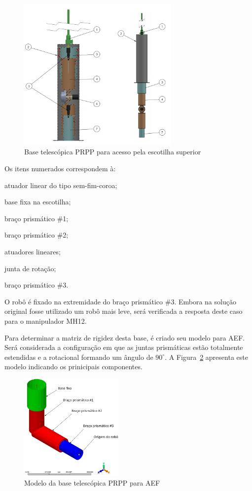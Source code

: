 \begin{figure}[h]
	\centering 
 	\includegraphics[width=0.70\textwidth]{figs/base_telesc}
 	\caption{Base telescópica PRPP para acesso pela escotilha superior}
 	\label{fig::base_telesc}
\end{figure}

Os itens numerados correspondem à: 
%
\begin{enumerate*}[label=(\arabic*)]
  \item atuador linear do tipo sem-fim-coroa;
  \item base fixa na escotilha;
  \item braço prismático \#1;
  \item braço prismático \#2;
  \item atuadores lineares;
  \item junta de rotação;
  \item braço prismático \#3.
\end{enumerate*}
%

O robô é fixado na extremidade do braço prismático \#3. Embora na solução
original fosse utilizado um robô mais leve, será verificada a resposta
deste caso para o manipulador MH12.

Para determinar a matriz de rigidez desta base, é criado seu modelo para AEF.
Será considerada a configuração em que as juntas prismáticas estão totalmente
estendidas e a rotacional formando um ângulo de $90^\circ$. A
Figura~\ref{fig::base_telesc_fea} apresenta este modelo indicando os prinicipais
componentes.

\begin{figure}[h]
	\centering 
 	\includegraphics[width=0.45\textwidth]{figs/base_telesc_fea}
 	\caption{Modelo da base telescópica PRPP para AEF}
 	\label{fig::base_telesc_fea}
\end{figure}


